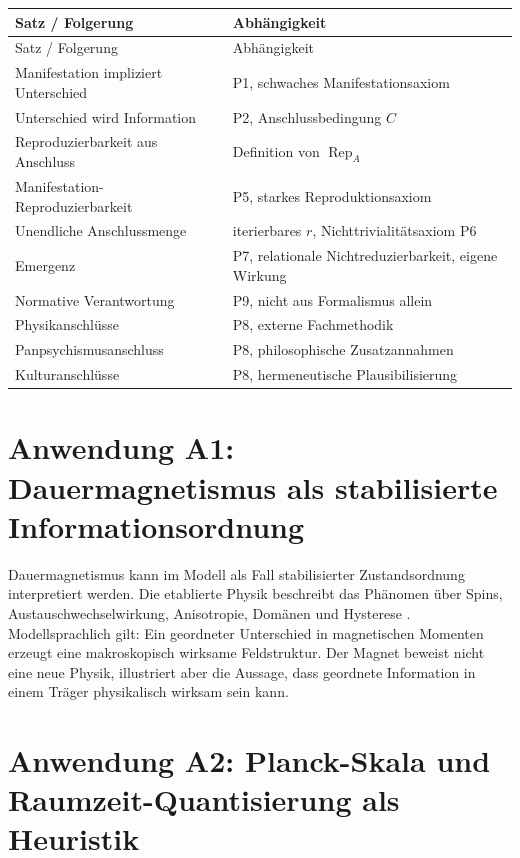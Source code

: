 \documentclass[11pt,a4paper]{article}
\theoremstyle{remark}
\newcommand{\Rep}{\operatorname{Rep}}
\begin{document}
\begin{longtable}{>{\raggedright\arraybackslash}p{}p{}}
\toprule
Satz / Folgerung & Abhängigkeit \\
\midrule
\endfirsthead
\toprule
Satz / Folgerung & Abhängigkeit \\
\midrule
\endhead
Manifestation impliziert Unterschied & P1, schwaches Manifestationsaxiom \\
Unterschied wird Information & P2, Anschlussbedingung $C$ \\
Reproduzierbarkeit aus Anschluss & Definition von $\Rep_A$ \\
Manifestation-Reproduzierbarkeit & P5, starkes Reproduktionsaxiom \\
Unendliche Anschlussmenge & iterierbares $r$, Nichttrivialitätsaxiom P6 \\
Emergenz & P7, relationale Nichtreduzierbarkeit, eigene Wirkung \\
Normative Verantwortung & P9, nicht aus Formalismus allein \\
Physikanschlüsse & P8, externe Fachmethodik \\
Panpsychismusanschluss & P8, philosophische Zusatzannahmen \\
Kulturanschlüsse & P8, hermeneutische Plausibilisierung \\
\bottomrule
\end{longtable}

\section{Anwendung A1: Dauermagnetismus als stabilisierte Informationsordnung}

Dauermagnetismus kann im Modell als Fall stabilisierter Zustandsordnung interpretiert werden. Die etablierte Physik beschreibt das Phänomen über Spins, Austauschwechselwirkung, Anisotropie, Domänen und Hysterese \parencite{kittel2005,coey2010}. Modellsprachlich gilt: Ein geordneter Unterschied in magnetischen Momenten erzeugt eine makroskopisch wirksame Feldstruktur. Der Magnet beweist nicht eine neue Physik, illustriert aber die Aussage, dass geordnete Information in einem Träger physikalisch wirksam sein kann.

\section{Anwendung A2: Planck-Skala und Raumzeit-Quantisierung als Heuristik}
\end{document}
